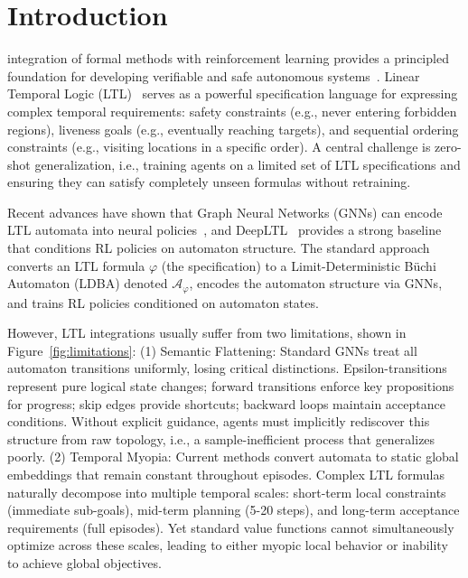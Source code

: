 \documentclass[journal]{IEEEtran}
\begin{document}
\section{Introduction}

 integration of formal methods with reinforcement learning provides a principled foundation for developing verifiable and safe autonomous systems~\citep{Baier2008}. Linear Temporal Logic (LTL)~\citep{Pnueli1977} serves as a powerful specification language for expressing complex temporal requirements: safety constraints (e.g., never entering forbidden regions), liveness goals (e.g., eventually reaching targets), and sequential ordering constraints (e.g., visiting locations in a specific order). A central challenge is zero-shot generalization, i.e., training agents on a limited set of LTL specifications and ensuring they can satisfy completely unseen formulas without retraining.

Recent advances have shown that Graph Neural Networks (GNNs) can encode LTL automata into neural policies~\citep{IcarteRewardMachines2019}, and DeepLTL~\citep{deepltl} provides a strong baseline that conditions RL policies on automaton structure. The standard approach converts an LTL formula $\varphi$ (the specification) to a Limit-Deterministic B\"uchi Automaton (LDBA) denoted $\mathcal{A}_\varphi$, encodes the automaton structure via GNNs, and trains RL policies conditioned on automaton states.

However, LTL integrations usually suffer from two limitations, shown in Figure~\ref{fig:limitations}: (1) Semantic Flattening: Standard GNNs treat all automaton transitions uniformly, losing critical distinctions. Epsilon-transitions represent pure logical state changes; forward transitions enforce key propositions for progress; skip edges provide shortcuts; backward loops maintain acceptance conditions. Without explicit guidance, agents must implicitly rediscover this structure from raw topology, i.e., a sample-inefficient process that generalizes poorly. (2) Temporal Myopia: Current methods convert automata to static global embeddings that remain constant throughout episodes. Complex LTL formulas naturally decompose into multiple temporal scales: short-term local constraints (immediate sub-goals), mid-term planning (5-20 steps), and long-term acceptance requirements (full episodes). Yet standard value functions cannot simultaneously optimize across these scales, leading to either myopic local behavior or inability to achieve global objectives.
\end{document}
